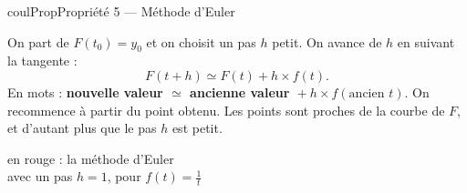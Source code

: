 \documentclass[11pt,a4paper]{article}
\makeatletter
\renewcommand{\approx}{\simeq}
\newcommand{\lycee@repere}[4]{%
  \draw[grille,step=1] (#1,#2) grid (#3,#4);
  \draw[-{Stealth[length=2mm]},thick] (#1,0)--({#3+0.4},0) node[below left=-1pt]{$x$};
  \draw[-{Stealth[length=2mm]},thick] (0,#2)--(0,{#4+0.4}) node[below left=-1pt]{$y$};
  \node[below left,font=\scriptsize,inner sep=1.5pt] at (0,0) {$0$};}
\newcommand{\lycee@gradx}[1]{\foreach \k/\l in {#1}{%
  \draw (\k,0.07)--(\k,-0.07) node[below,font=\scriptsize,inner sep=1.5pt]{$\l$};}}
\newcommand{\lycee@grady}[1]{\foreach \k/\l in {#1}{%
  \draw (0.07,\k)--(-0.07,\k) node[left,font=\scriptsize,inner sep=1.5pt]{$\l$};}}
\providecommand{\repere}{\lycee@repere}%
\providecommand{\gradx}{\lycee@gradx}%
\providecommand{\grady}{\lycee@grady}%
\newcounter{lycee@signet}
\newcommand{\signet}[3][]{\stepcounter{lycee@signet}%
  \edef\lycee@dest{\if\relax\detokenize{#1}\relax
    signet.\arabic{lycee@signet}\else#1\fi}%
  \hypertarget{\lycee@dest}{}\bookmark[level=#2,dest=\lycee@dest]{#3}}
\newenvironment{proprietebox}[1][Propriété]%
  {\begin{boitecours}[phantom={\signet{2}{#1}}]{coulProp}{#1}}{\end{boitecours}}
\makeatother
\begin{document}
\begin{proprietebox}[Propriété 5 --- Méthode d'Euler]
\begin{minipage}[c]{0.58\linewidth}\raggedright
On part de ${F(t_{0})=y_{0}}$ et on choisit un pas $h$ petit. On avance de $h$ en suivant
la tangente :
\[
  F(t+h)\approx F(t)+h\times f(t).
\]
En mots : \textbf{nouvelle valeur ${}\approx{}$ ancienne valeur ${}+h\times f(\text{ancien }t)$}. On recommence à partir du point obtenu. Les points sont proches de la courbe
de $F$, et d'autant plus que le pas $h$ est petit.
\end{minipage}\hfill
\begin{minipage}[c]{0.38\linewidth}\centering
{}\par
{\footnotesize en rouge : la méthode d'Euler\\ avec un pas $h=1$, pour $f(t)=\frac{1}{t}$}
\end{minipage}
\end{proprietebox}
\end{document}
